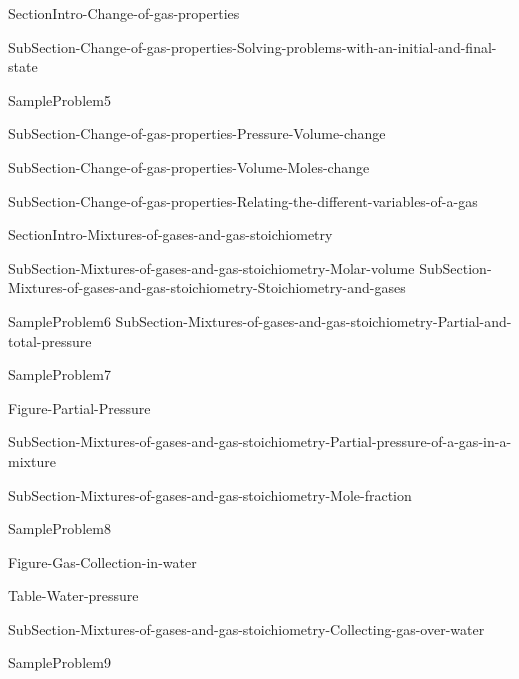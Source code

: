 \documentclass[main.tex]{subfiles}
\begin{document}
 {SectionIntro-Change-of-gas-properties}

\sloppy 
\begin{description}
 {SubSection-Change-of-gas-properties-Solving-problems-with-an-initial-and-final-state}





{SampleProblem5}



 {SubSection-Change-of-gas-properties-Pressure-Volume-change}


 {SubSection-Change-of-gas-properties-Volume-Moles-change}



 {SubSection-Change-of-gas-properties-Relating-the-different-variables-of-a-gas}




\end{description}










 
 {SectionIntro-Mixtures-of-gases-and-gas-stoichiometry}
 
 
\sloppy 
\begin{description}
 {SubSection-Mixtures-of-gases-and-gas-stoichiometry-Molar-volume}
 {SubSection-Mixtures-of-gases-and-gas-stoichiometry-Stoichiometry-and-gases}



{SampleProblem6}
 {SubSection-Mixtures-of-gases-and-gas-stoichiometry-Partial-and-total-pressure}





{SampleProblem7}

 {Figure-Partial-Pressure}


 
 {SubSection-Mixtures-of-gases-and-gas-stoichiometry-Partial-pressure-of-a-gas-in-a-mixture}

 {SubSection-Mixtures-of-gases-and-gas-stoichiometry-Mole-fraction}




{SampleProblem8}



 {Figure-Gas-Collection-in-water}


{Table-Water-pressure}


 {SubSection-Mixtures-of-gases-and-gas-stoichiometry-Collecting-gas-over-water}



{SampleProblem9}





\end{description}
\end{document}
